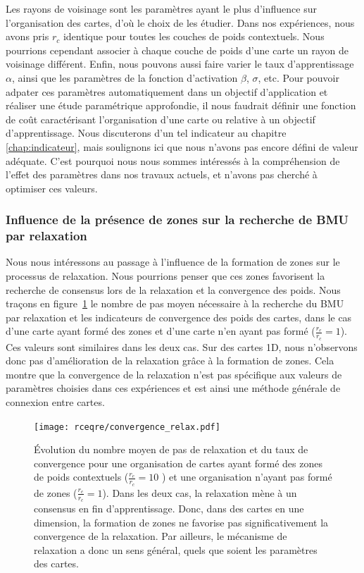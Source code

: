 \documentclass[../main]{subfiles}
\begin{document}
Les rayons de voisinage sont les paramètres ayant le plus d'influence sur l'organisation des cartes, d'où le choix de les étudier.
Dans nos expériences, nous avons pris $r_c$ identique pour toutes les couches de poids contextuels.
Nous pourrions cependant associer à chaque couche de poids d'une carte un rayon de voisinage différent. 
Enfin, nous pouvons aussi faire varier le taux d'apprentissage $\alpha$, ainsi que les paramètres de la fonction d'activation $\beta$, $\sigma$, etc.
Pour pouvoir adpater ces paramètres automatiquement dans un objectif d'application et réaliser une étude paramétrique approfondie, il nous faudrait définir une fonction de coût caractérisant l'organisation d'une carte ou relative à un objectif d'apprentissage. 
Nous discuterons d'un tel indicateur au chapitre \ref{chap:indicateur}, mais soulignons ici que nous n'avons pas encore défini de valeur adéquate. 
C'est pourquoi nous nous sommes intéressés à la compréhension de l'effet des paramètres dans nos travaux actuels, et n'avons pas cherché à optimiser ces valeurs.


\subsubsection{Influence de la présence de zones sur la recherche de BMU par relaxation}

Nous nous intéressons au passage à l'influence de la formation de zones sur le processus de relaxation.
Nous pourrions penser que ces zones favorisent la recherche de consensus lors de la relaxation et la convergence des poids.
Nous traçons en figure~\ref{fig:conv_rcre} le nombre de pas moyen nécessaire à la recherche du BMU par relaxation et les indicateurs de convergence des poids des cartes, dans le cas d'une carte ayant formé des zones et d'une carte n'en ayant pas formé ($\frac{r_e}{r_c} = 1$). 
Ces valeurs sont similaires dans les deux cas.
Sur des cartes 1D, nous n'observons donc pas d'amélioration de la relaxation grâce à la formation de zones.
Cela montre que la convergence de la relaxation n'est pas spécifique aux valeurs de paramètres choisies dans ces expériences et est ainsi une méthode générale de connexion entre cartes.

\begin{figure}
	\texttt{[image: rceqre/convergence\_relax.pdf]}
	\caption{\'Evolution du nombre moyen de pas de relaxation et du taux de convergence pour une organisation de cartes ayant formé des zones de poids contextuels ($\frac{r_e}{r_c} = 10$ ) et une organisation n'ayant pas formé de zones ($\frac{r_e}{r_c} = 1$). Dans les deux cas, la relaxation mène à un consensus en fin d'apprentissage.
	Donc, dans des cartes en une dimension, la formation de zones ne favorise pas significativement la convergence de la relaxation. Par ailleurs, le mécanisme de relaxation a donc un sens général, quels que soient les paramètres des cartes. \label{fig:conv_rcre}}
\end{figure}
\end{document}

